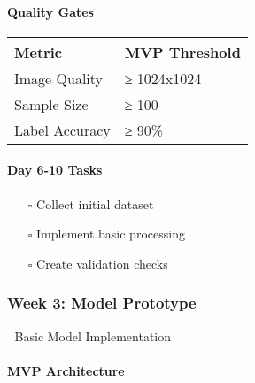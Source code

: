 \paragraph{Quality Gates}\label{quality-gates}

\begin{longtable}[]{@{}ll@{}}
\toprule\noalign{}
Metric & MVP Threshold \\
\midrule\noalign{}
\endhead
\bottomrule\noalign{}
\endlastfoot
Image Quality & ≥ 1024x1024 \\
Sample Size & ≥ 100 \\
Label Accuracy & ≥ 90\% \\
\end{longtable}

\paragraph{Day 6-10 Tasks}\label{day-6-10-tasks}

\begin{itemize}
\tightlist
\item[$\square$]
  Collect initial dataset
\item[$\square$]
  Implement basic processing
\item[$\square$]
  Create validation checks
\end{itemize}

\subsubsection{Week 3: Model Prototype}\label{week-3-model-prototype}

🧠 Basic Model Implementation

\paragraph{MVP Architecture}\label{mvp-architecture}

\begin{Shaded}
\begin{Highlighting}[]
     \NormalTok{(}\NormalTok{):}
        \NormalTok{()}
        \OperatorTok{=}
\OperatorTok{=}\NormalTok{,}
\OperatorTok{=}
\NormalTok{        )}
        \OperatorTok{=}\NormalTok{, }\NormalTok{)}

\OperatorTok{=} 
         
\end{Highlighting}
\end{Shaded}

